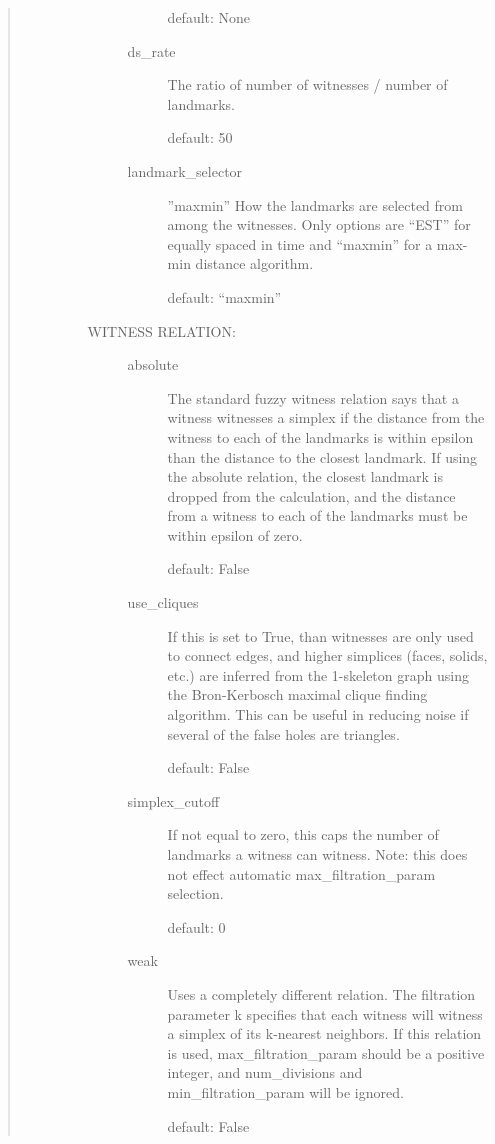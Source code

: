 \documentclass[letterpaper,10pt,openany,oneside,english]{sphinxmanual}
\begin{document}
\begin{fulllineitems}
\begin{quote}
\begin{description}
\begin{itemize}
\begin{description}
\begin{description}
default: None

\item[{ds\_rate}] \leavevmode
The ratio of number of witnesses / number of landmarks.

default: 50

\item[{landmark\_selector}] \leavevmode
”maxmin” How the landmarks are selected from among the
witnesses. Only options are “EST” for equally spaced in time
and “maxmin” for a max-min distance algorithm.

default: “maxmin”

\end{description}

\item[{WITNESS RELATION:}] \leavevmode\begin{description}
\item[{absolute}] \leavevmode
The standard fuzzy witness relation says that a witness
witnesses a simplex if the distance from the witness to each of
the landmarks is within epsilon  than the distance to the
closest landmark. If using the absolute relation, the closest
landmark is dropped from the calculation, and the distance from
a witness to each of the landmarks must be within epsilon of
zero.

default: False

\item[{use\_cliques}] \leavevmode
If this is set to True, than witnesses are only used to
connect edges, and higher simplices (faces, solids, etc.) are
inferred from the 1-skeleton graph using the Bron-Kerbosch
maximal clique finding algorithm. This can be useful in
reducing noise if several of the false holes are triangles.

default: False

\item[{simplex\_cutoff}] \leavevmode
If not equal to zero, this caps the number of landmarks a
witness can witness. Note: this does not effect automatic
max\_filtration\_param selection.

default: 0

\item[{weak}] \leavevmode
Uses a completely different relation. The filtration
parameter k specifies that each witness will witness a
simplex of its k-nearest neighbors. If this relation is used,
max\_filtration\_param should be a positive integer,
and num\_divisions and min\_filtration\_param will be ignored.

default: False


\end{description}
\end{description}
\end{itemize}
\end{description}
\end{quote}
\end{fulllineitems}
\end{document}
